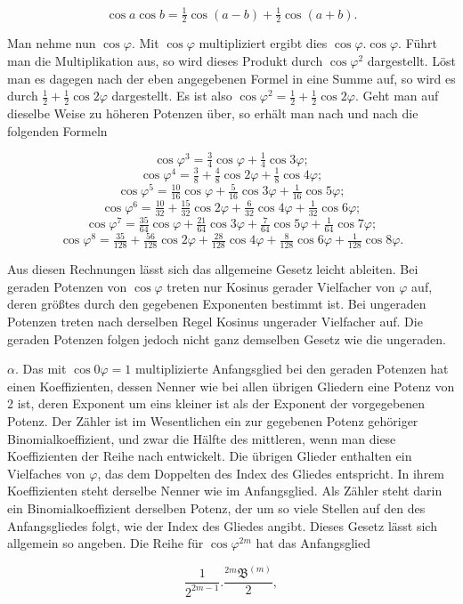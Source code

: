 \[ \cos a \cos b = \tfrac12\cos(a-b)+\tfrac12\cos(a+b). \]

\par\noindent\hspace*{\parindent}Man nehme nun $\cos\varphi$. Mit $\cos\varphi$ multipliziert ergibt dies $\cos\varphi . \cos\varphi$. Führt man die Multiplikation aus, so wird dieses Produkt durch $\cos\varphi^2$ dargestellt. Löst man es dagegen nach der eben angegebenen Formel in eine Summe auf, so wird es durch $\tfrac12+\tfrac12\cos 2\varphi$ dargestellt. Es ist also $\cos\varphi^2 = \tfrac12+\tfrac12\cos 2\varphi$. Geht man auf dieselbe Weise zu höheren Potenzen über, so erhält man nach und nach die folgenden Formeln

\[ \cos\varphi^3 = \tfrac34\cos\varphi + \tfrac14\cos 3\varphi ; \]
\[ \cos\varphi^4 = \tfrac38 + \tfrac48\cos 2\varphi + \tfrac18\cos 4\varphi ; \]
\[ \cos\varphi^5 = \tfrac{10}{16}\cos\varphi + \tfrac{5}{16}\cos 3\varphi + \tfrac{1}{16}\cos 5\varphi ; \]
\[ \cos\varphi^6 = \tfrac{10}{32} + \tfrac{15}{32}\cos 2\varphi + \tfrac{6}{32}\cos 4\varphi + \tfrac{1}{32}\cos 6\varphi ; \]
\[ \cos\varphi^7 = \tfrac{35}{64}\cos\varphi + \tfrac{21}{64}\cos 3\varphi + \tfrac{7}{64}\cos 5\varphi + \tfrac{1}{64}\cos 7\varphi ; \]
\[ \cos\varphi^8 = \tfrac{35}{128} + \tfrac{56}{128}\cos 2\varphi + \tfrac{28}{128}\cos 4\varphi + \tfrac{8}{128}\cos 6\varphi + \tfrac{1}{128}\cos 8\varphi . \]

\par\noindent Aus diesen Rechnungen lässt sich das allgemeine Gesetz leicht ableiten. Bei geraden Potenzen von $\cos\varphi$ treten nur Kosinus gerader Vielfacher von $\varphi$ auf, deren größtes durch den gegebenen Exponenten bestimmt ist. Bei ungeraden Potenzen treten nach derselben Regel Kosinus ungerader Vielfacher auf. Die geraden Potenzen folgen jedoch nicht ganz demselben Gesetz wie die ungeraden.

$\alpha$. Das mit $\cos 0\varphi = 1$ multiplizierte Anfangsglied bei den geraden Potenzen hat einen Koeffizienten, dessen Nenner wie bei allen übrigen Gliedern eine Potenz von 2 ist, deren Exponent um eins kleiner ist als der Exponent der vorgegebenen Potenz. Der Zähler ist im Wesentlichen ein zur gegebenen Potenz gehöriger Binomialkoeffizient, und zwar die Hälfte des mittleren, wenn man diese Koeffizienten der Reihe nach entwickelt. Die übrigen Glieder enthalten ein Vielfaches von $\varphi$, das dem Doppelten des Index des Gliedes entspricht. In ihrem Koeffizienten steht derselbe Nenner wie im Anfangsglied. Als Zähler steht darin ein Binomialkoeffizient derselben Potenz, der um so viele Stellen auf den des Anfangsgliedes folgt, wie der Index des Gliedes angibt. Dieses Gesetz lässt sich allgemein so angeben. Die Reihe für $\cos\varphi^{2m}$ hat das Anfangsglied

\[ \frac{1}{2^{2m-1}} . \frac{{}^{2m}\mathfrak{B}^{(m)}}{2}, \]
